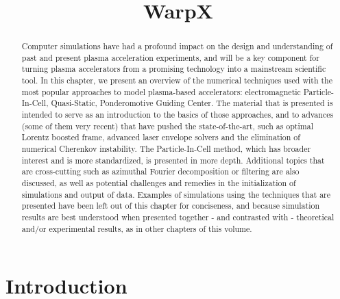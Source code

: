\documentclass[]{report}
\begin{document}

\title{WarpX}



\maketitle

\linenumbers

\begin{abstract}
Computer simulations have had a profound impact on the design and understanding of past and present plasma acceleration experiments, and will be a key component for turning plasma accelerators from a promising technology into a mainstream scientific tool. In this chapter, we present an overview of the numerical techniques used with the most popular approaches to model plasma-based accelerators: electromagnetic Particle-In-Cell, Quasi-Static, Ponderomotive Guiding Center.
The material that is presented is intended to serve as an introduction to the basics of those approaches, and to advances (some of them very recent) that have pushed the state-of-the-art, such as optimal Lorentz boosted frame, advanced laser envelope solvers and the elimination of numerical Cherenkov instability. The Particle-In-Cell method, which has broader interest and is more standardized, is presented in more depth. Additional topics that are cross-cutting such as azimuthal Fourier decomposition or filtering are also discussed, as well as potential challenges and remedies in the initialization of simulations and output of data.  Examples of simulations using the techniques that are presented have been left out of this chapter for conciseness, and because simulation results are best understood when presented together - and contrasted with - theoretical and/or experimental results, as in other chapters of this volume.
\end{abstract}

\section{Introduction}
\end{document}
